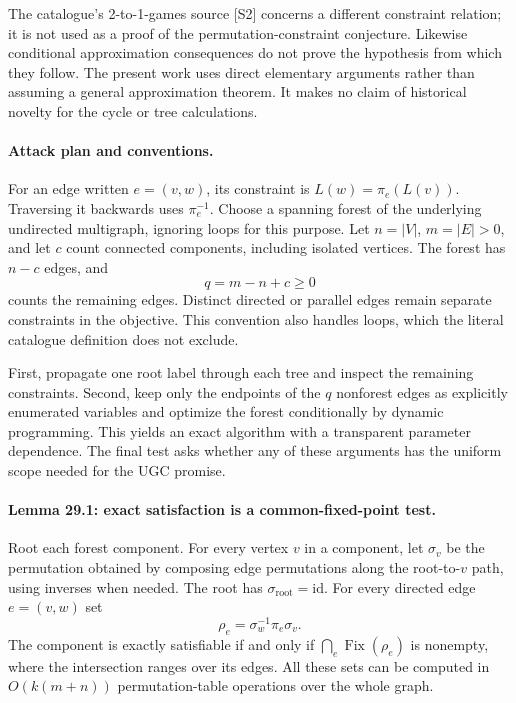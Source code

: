 \documentclass[11pt]{article}
\begin{document}
The catalogue's 2-to-1-games source [S2] concerns a different constraint
relation; it is not used as a proof of the permutation-constraint conjecture.
Likewise conditional approximation consequences do not prove the hypothesis
from which they follow. The present work uses direct elementary arguments
rather than assuming a general approximation theorem. It makes no claim
of historical novelty for the cycle or tree calculations.

\paragraph{Attack plan and conventions.}
For an edge written $e=(v,w)$, its constraint is
$L(w)=\pi_e(L(v))$. Traversing it backwards uses $\pi_e^{-1}$.
Choose a spanning forest of the underlying undirected multigraph, ignoring
loops for this purpose. Let $n=|V|$, $m=|E|>0$, and let $c$ count connected
components, including isolated vertices. The forest has $n-c$ edges, and
\[
                         q=m-n+c\ge0
\]
counts the remaining edges. Distinct directed or parallel edges remain
separate constraints in the objective. This convention also handles loops,
which the literal catalogue definition does not exclude.

First, propagate one root label through each tree and inspect the remaining
constraints. Second, keep only the endpoints of the $q$ nonforest edges as
explicitly enumerated variables and optimize the forest conditionally by
dynamic programming. This yields an exact algorithm with a transparent
parameter dependence. The final test asks whether any of these arguments
has the uniform scope needed for the UGC promise.

\paragraph{Lemma 29.1: exact satisfaction is a common-fixed-point test.}
Root each forest component. For every vertex $v$ in a component, let
$\sigma_v$ be the permutation obtained by composing edge permutations along
the root-to-$v$ path, using inverses when needed. The root has
$\sigma_{\mathrm{root}}=\mathrm{id}$. For every directed edge $e=(v,w)$
set
\begin{equation}\label{a29:cycle}
                       \rho_e=\sigma_w^{-1}\pi_e\sigma_v.
\end{equation}
The component is exactly satisfiable if and only if
$\bigcap_e\operatorname{Fix}(\rho_e)$ is nonempty, where the intersection
ranges over its edges. All these sets can be computed in
$O(k(m+n))$ permutation-table operations over the whole graph.
\end{document}
